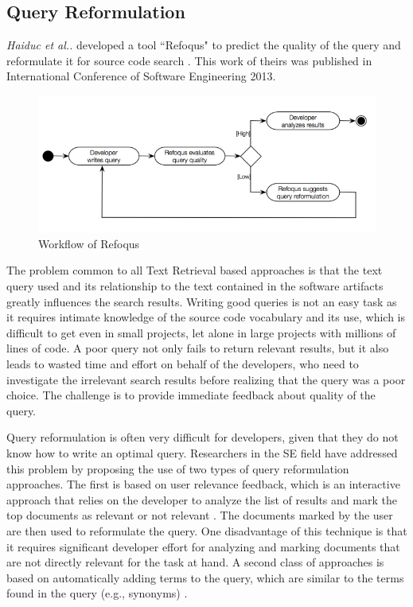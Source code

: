 \documentclass{report}
\begin{document}
\subsection{Query Reformulation}
\label{sec:queryReformulate}
\textit{Haiduc et al..} developed a tool ``Refoqus" to predict the quality of the query and reformulate it
for source code search \cite{haiducRefoqus13}. This work of theirs was published in International
Conference of Software Engineering 2013.

\begin{figure}
\centering
\includegraphics[scale=0.7]{img/refoqus}
\caption{Workflow of Refoqus}
\label{fig:refoqus}
\end{figure}

The problem common to all Text Retrieval based approaches is that the text query used and its relationship
to the text contained in the software artifacts greatly influences the search results. Writing good
queries is not an easy task as it requires intimate knowledge of the source code vocabulary and its use,
which is difficult to get even in small projects, let alone in large projects with millions of lines of code.
A poor query not only fails to return relevant results, but it also leads to wasted time and effort
on behalf of the developers, who need to investigate the irrelevant search results before realizing that
the query was a poor choice. The challenge is to provide immediate feedback about quality of the query.

Query reformulation is often very difficult for developers, given that they do not know how to write an
optimal query. Researchers in the SE field have addressed this problem by proposing the use of two types
of query reformulation approaches. The first is based on user relevance feedback, which is an interactive
approach that relies on the developer to analyze the list of results and mark the top documents as
relevant or not relevant \cite{deLucia06}. The documents marked by the user are then used to reformulate
the query. One disadvantage of this technique is that it requires significant developer effort for
analyzing and marking documents that are not directly relevant for the task at hand. A second class of
approaches is based on automatically adding terms to the query, which are similar to the terms found in
the query (e.g., synonyms) \cite{gibiec10}.
\end{document}
